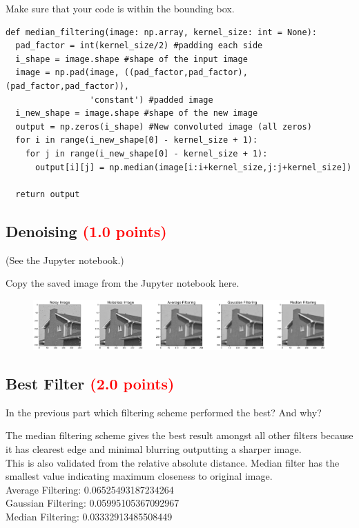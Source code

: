\documentclass[answers]{exam}
\newcommand{\mypoints}[1]{\textcolor{red}{(#1 points)}}
\begin{document}
Make sure that your code is within the bounding box.
\begin{solution}
\begin{verbatim}
def median_filtering(image: np.array, kernel_size: int = None):
  pad_factor = int(kernel_size/2) #padding each side
  i_shape = image.shape #shape of the input image
  image = np.pad(image, ((pad_factor,pad_factor),(pad_factor,pad_factor)),
                 'constant') #padded image
  i_new_shape = image.shape #shape of the new image
  output = np.zeros(i_shape) #New convoluted image (all zeros)
  for i in range(i_new_shape[0] - kernel_size + 1):
    for j in range(i_new_shape[0] - kernel_size + 1):
      output[i][j] = np.median(image[i:i+kernel_size,j:j+kernel_size])

  return output
\end{verbatim}
\end{solution}

\subsection{Denoising \mypoints{1.0}}
(See the Jupyter notebook.)

Copy the saved image from the Jupyter notebook here.
\begin{solution}
\begin{figure}[H]
    \centering
    \includegraphics[width=1.0\linewidth]{Images/question_3_5.pdf}
\end{figure}
\end{solution}

\subsection{Best Filter \mypoints{2.0}}
In the previous part which filtering scheme performed the best? And why?
\begin{solution}
The median filtering scheme gives the best result amongst all other filters because it has clearest edge and minimal blurring outputting a sharper image.\\
This is also validated from the relative absolute distance. Median filter has the smallest value indicating maximum closeness to original image.\\

Average Filtering: 0.06525493187234264\\
Gaussian Filtering: 0.05995105367092967\\
Median Filtering: 0.03332913485508449\\
\end{solution}
\end{document}
